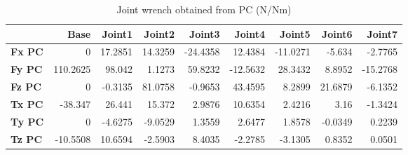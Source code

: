 \begin{table}[h!]
	\centering
	\caption{Joint wrench obtained from PC (N/Nm)}
	\label{wrech_PC_Pose4}
	\begin{tabular}{|l|r|r|r|r|r|r|r|r|}
		\hline
		\textbf{}  & \textbf{Base} & \textbf{Joint1}  & \textbf{Joint2}  & \textbf{Joint3}  & \textbf{Joint4}  & \textbf{Joint5}  & \textbf{Joint6}  & \textbf{Joint7} \\ \hline
		\textbf{Fx PC}  & 0        & 17.2851        & 14.3259        & -24.4358        & 12.4384        & -11.0271        & -5.634        & -2.7765 \\ \hline
		\textbf{Fy PC}  & 110.2625        & 98.042        & 1.1273        & 59.8232        & -12.5632        & 28.3432        & 8.8952        & -15.2768 \\ \hline
		\textbf{Fz PC}  & 0        & -0.3135        & 81.0758        & -0.9653        & 43.4595        & 8.2899        & 21.6879        & -6.1352 \\ \hline
		\textbf{Tx PC}  & -38.347        & 26.441        & 15.372        & 2.9876        & 10.6354        & 2.4216        & 3.16        & -1.3424 \\ \hline
		\textbf{Ty PC}  & 0        & -4.6275        & -9.0529        & 1.3559        & 2.6477        & 1.8578        & -0.0349        & 0.2239 \\ \hline
		\textbf{Tz PC}  & -10.5508        & 10.6594        & -2.5903        & 8.4035        & -2.2785        & -3.1305        & 0.8352        & 0.0501 \\ \hline
	\end{tabular}
\end{table}

